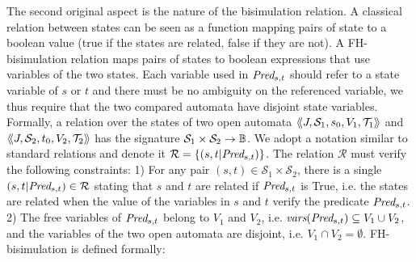 \documentclass{lmcs}
\begin{document}
The second original aspect is the nature of the bisimulation relation.
 A classical relation between states can be seen as a function mapping pairs of state to a boolean value (true if the states are related, false if they are not). A FH-bisimulation relation maps pairs of states to boolean expressions that use variables of the two states.  Each variable used in $\Pred_{s,t}$ should refer to a state variable of $s$ or $t$ and there must be no ambiguity on the referenced variable, we thus require that the two compared automata have disjoint state variables.
Formally, a relation over the states of two open automata  $\langle\hspace{-0.45ex}\langle J,\mathcal{S}_1, s_0,V_1,
   \mathcal{T}_1 \rangle\hspace{-0.45ex}\rangle$ and $\langle\hspace{-0.45ex}\langle J,\mathcal{S}_2,t_0,V_2, \mathcal{T}_2 \rangle\hspace{-0.45ex}\rangle$ has the signature $\mathcal{S}_1\times\mathcal{S}_2\to\mathbb{B}$. 
We adopt a notation similar to standard relations and denote it
 $\mathcal{R}=\{(s,t|\Pred_{s,t})\}$. 
The relation $\mathcal{R}$ must verify the following constraints: 1) For any pair $(s,t)\in \mathcal{S}_1\times \mathcal{S}_2$, there is a 
   single
      $(s,t|\Pred_{s,t})\in\mathcal{R}$  stating that $s$ and $t$ are related 
      if $\Pred_{s,t}$       is 
      True, i.e. the states are related when the value of the variables in $s$ and $t$  verify the predicate $\Pred_{s,t}$. 2) The free variables of  $\Pred_{s,t}$ belong to $V_1$ and $V_2$, i.e. $\vars(\Pred_{s,t})\subseteq V_1\cup V_2$, and the variables of the two open automata are disjoint, i.e.  $V_1\cap V_2=\emptyset$.
 FH-bisimulation is defined formally: 
\end{document}
